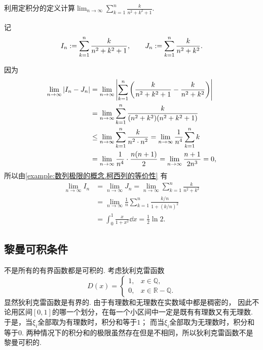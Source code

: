 \begin{example}
利用定积分的定义计算\(\lim_{n\to\infty} \sum_{k=1}^n \frac{k}{n^2+k^2+1}\).
\begin{solution}
记\begin{equation*}
	I_n := \sum_{k=1}^n \frac{k}{n^2+k^2+1},
	\qquad
	J_n := \sum_{k=1}^n \frac{k}{n^2+k^2}.
\end{equation*}

因为\begin{align*}
	\lim_{n\to\infty} \abs{I_n - J_n}
	&= \lim_{n\to\infty} \abs{
		\sum_{k=1}^n \left( \frac{k}{n^2+k^2+1} - \frac{k}{n^2+k^2} \right)
	} \\
	&= \lim_{n\to\infty} \sum_{k=1}^n \frac{k}{(n^2+k^2)(n^2+k^2+1)} \\
	&\leq \lim_{n\to\infty} \sum_{k=1}^n \frac{k}{n^2 \cdot n^2}
	= \lim_{n\to\infty} \frac1{n^4} \sum_{k=1}^n k \\
	&= \lim_{n\to\infty} \frac1{n^4} \cdot \frac{n(n+1)}2
	= \lim_{n\to\infty} \frac{n+1}{2n^3}
	= 0,
\end{align*}
所以由\cref{example:数列极限的概念.柯西列的等价性} 有\begin{align*}
	\lim_{n\to\infty} I_n
	&= \lim_{n\to\infty} J_n
	= \lim_{n\to\infty} \sum_{k=1}^n \frac{k}{n^2+k^2} \\
	&= \lim_{n\to\infty} \frac1n \sum_{k=1}^n
		\frac{
			k/n
		}{
			1 + \left( k/n \right)^2
		} \\
	&= \int_0^1 \frac{x}{1+x^2} \dd{x}
	= \frac12 \ln2.
\end{align*}
\end{solution}
\end{example}

\subsection{黎曼可积条件}
不是所有的有界函数都是可积的.
考虑狄利克雷函数\begin{equation*}
	D(x) = \left\{ \begin{array}{ll}
		1, & x \in \mathbb{Q}, \\
		0, & x \in \mathbb{R}-\mathbb{Q}.
	\end{array} \right.
\end{equation*}
显然狄利克雷函数是有界的.
由于有理数和无理数在实数域中都是稠密的，
因此不论用区间\([0,1]\)的哪一个划分，在每一个小区间中一定是既有有理数又有无理数.
于是，当\(\xi_i\)全部取为有理数时，积分和等于\(1\)；
而当\(\xi_i\)全部取为无理数时，积分和等于\(0\).
两种情况下的积分和的极限虽然存在但是不相同，所以狄利克雷函数不是黎曼可积的.

